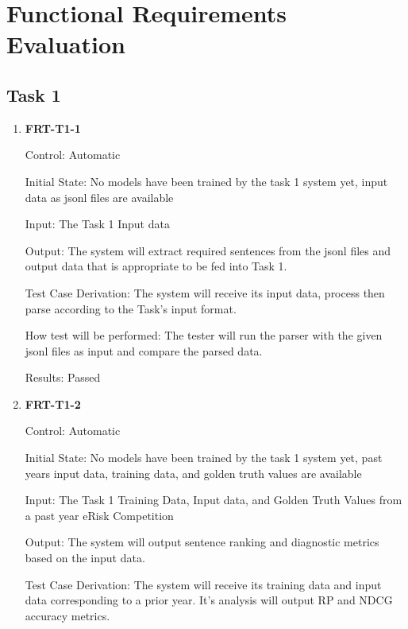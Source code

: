 \documentclass[12pt, titlepage]{article}
\begin{document}
\newpage


\tableofcontents


\listoftables %


\listoffigures %


\newpage






\section{Functional Requirements Evaluation}
\subsection{Task 1}


\begin{enumerate}
\item \textbf{FRT-T1-1}


Control: Automatic


Initial State: No models have been trained by the task 1 system yet, input data as jsonl files are available


Input: The Task 1 Input data


Output: The system will extract required sentences from the jsonl files and output data that is appropriate to be fed into Task 1.


Test Case Derivation: The system will receive its input data, process then parse according to the Task's input format.


How test will be performed: The tester will run the parser with the given jsonl files as input and compare the parsed data.


Results: Passed


\item \textbf{FRT-T1-2}


Control: Automatic


Initial State: No models have been trained by the task 1 system yet, past years input data, training data, and golden truth values are available


Input: The Task 1 Training Data, Input data, and Golden Truth Values from a past year eRisk Competition


Output: The system will output sentence ranking and diagnostic metrics based on the input data.


Test Case Derivation: The system will receive its training data and input data corresponding to a prior year. It's analysis will output RP and NDCG accuracy metrics.



\end{enumerate}
\end{document}
